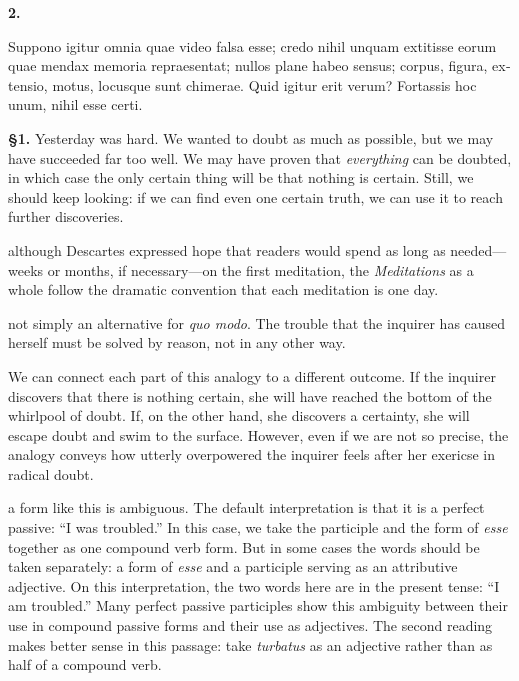     \textbf{2.} \begin{latin}Suppono igitur omnia quae video falsa esse; credo nihil unquam extitisse eorum quae mendax memoria repraesentat; nullos plane habeo sensus; corpus, figura, extensio, motus, locusque sunt chimerae. Quid igitur erit verum? Fortassis hoc unum, nihil esse certi.\end{latin}
\pend
\endnumbering

\prenotes

\textbf{§1.} Yesterday was hard. We wanted to doubt as much as possible, but we may have succeeded far too well. We may have proven that \textit{everything} can be doubted, in which case the only certain thing will be that nothing is certain. Still, we should keep looking: if we can find even one certain truth, we can use it to reach further discoveries.

 although Descartes expressed hope that readers would spend as long as needed---weeks or months, if necessary---on the first meditation, the \textit{Meditations} as a whole follow the dramatic convention that each meditation is one day.

 not simply an alternative for \textit{quo modo}. The trouble that the inquirer has caused herself must be solved by reason, not in any other way.

 We can connect each part of this analogy to a different outcome. If the inquirer discovers that there is nothing certain, she will have reached the bottom of the whirlpool of doubt. If, on the other hand, she discovers a certainty, she will escape doubt and swim to the surface. However, even if we are not so precise, the analogy conveys how utterly overpowered the inquirer feels after her exericse in radical doubt.

 a form like this is ambiguous. The default interpretation is that it is a perfect passive: ``I was troubled.'' In this case, we take the participle and the form of \textit{esse} together as one compound verb form. But in some cases the words should be taken separately: a form of \textit{esse} and a participle serving as an attributive adjective. On this interpretation, the two words here are in the present tense: ``I am troubled.'' Many perfect passive participles show this ambiguity between their use in compound passive forms and their use as adjectives. The second reading makes better sense in this passage: take \textit{turbatus} as an adjective rather than as half of a compound verb.

